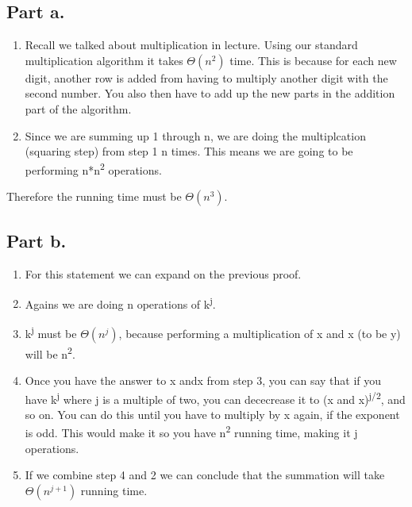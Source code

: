 \documentclass[]{article}
\providecommand{\tightlist}{%
  \setlength{\itemsep}{0pt}\setlength{\parskip}{0pt}}
\begin{document}
\subsection{Part a.}\label{part-a.}

\begin{enumerate}
\def\labelenumi{\arabic{enumi}.}
\tightlist
\item
  Recall we talked about multiplication in lecture. Using our standard
  multiplication algorithm it takes \(\Theta(n^2)\) time. This is
  because for each new digit, another row is added from having to
  multiply another digit with the second number. You also then have to
  add up the new parts in the addition part of the algorithm.
\item
  Since we are summing up 1 through n, we are doing the multiplcation
  (squaring step) from step 1 n times. This means we are going to be
  performing n*n\textsuperscript{2} operations.
\end{enumerate}

Therefore the running time must be \(\Theta(n^3)\).

\pagebreak

\subsection{Part b.}\label{part-b.}

\begin{enumerate}
\def\labelenumi{\arabic{enumi}.}
\tightlist
\item
  For this statement we can expand on the previous proof.
\item
  Agains we are doing n operations of k\textsuperscript{j}.
\item
  k\textsuperscript{j} must be \(\Theta(n^j)\), because performing a
  multiplication of x and x (to be y) will be n\textsuperscript{2}.
\item
  Once you have the answer to x andx from step 3, you can say that if
  you have k\textsuperscript{j} where j is a multiple of two, you can
  dececrease it to (x and x)\textsuperscript{j/2}, and so on. You can do
  this until you have to multiply by x again, if the exponent is odd.
  This would make it so you have n\textsuperscript{2} running time,
  making it j operations.
\item
  If we combine step 4 and 2 we can conclude that the summation will
  take \(\Theta(n^{j+1})\) running time.
\end{enumerate}
\end{document}
